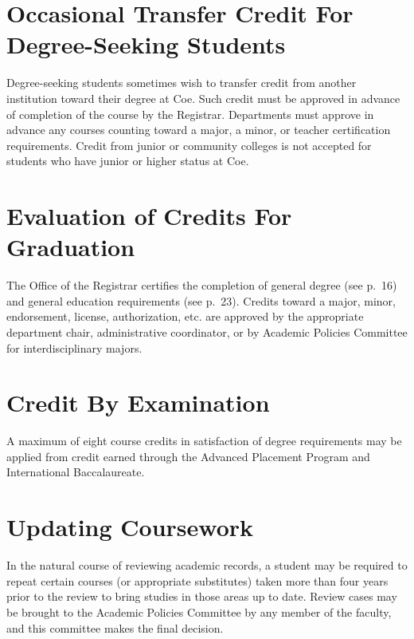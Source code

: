\documentclass[
  letterpaper,
]{scrbook}
\begin{document}
\section{Occasional Transfer Credit For Degree-Seeking
Students}\label{occasional-transfer-credit-for-degree-seeking-students}

Degree-seeking students sometimes wish to transfer credit from another
institution toward their degree at Coe. Such credit must be approved in
advance of completion of the course by the Registrar. Departments must
approve in advance any courses counting toward a major, a minor, or
teacher certification requirements. Credit from junior or community
colleges is not accepted for students who have junior or higher status
at Coe.

\section{Evaluation of Credits For
Graduation}\label{evaluation-of-credits-for-graduation}

The Office of the Registrar certifies the completion of general degree
(see p.~16) and general education requirements (see p.~23). Credits
toward a major, minor, endorsement, license, authorization, etc. are
approved by the appropriate department chair, administrative
coordinator, or by Academic Policies Committee for interdisciplinary
majors.

\section{Credit By Examination}\label{credit-by-examination}

A maximum of eight course credits in satisfaction of degree requirements
may be applied from credit earned through the Advanced Placement Program
and International Baccalaureate.

\section{Updating Coursework}\label{updating-coursework}

In the natural course of reviewing academic records, a student may be
required to repeat certain courses (or appropriate substitutes) taken
more than four years prior to the review to bring studies in those areas
up to date. Review cases may be brought to the Academic Policies
Committee by any member of the faculty, and this committee makes the
final decision.
\end{document}
